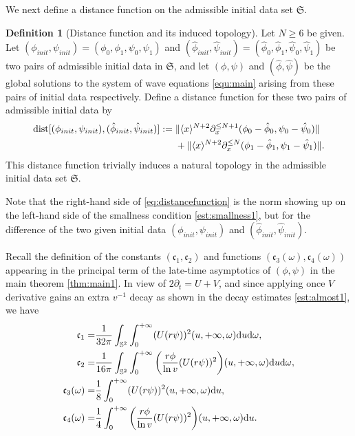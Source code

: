 \documentclass[a4paper,reqno]{amsart}
\theoremstyle{definition}
\newtheorem{definition}[theorem]{Definition}
\numberwithin{equation}{section}
\def \d {{\rm{d}}}
\def\cfrak{\mathfrak{c}}
\def\phiinit{\phi_{init}}
\def\phih{\hat{\phi}}
\def\psiinit{\psi_{init}}
\def\phihinit{\phih_{init}}
\def\psih{\hat{\psi}}
\def\psihinit{\psih_{init}}
\def\lab{\label}
\providecommand{\dist}[1]{\mathrm{dist}[#1]}
\def\Sfrak{\mathfrak{S}}
\begin{document}
We next define a distance function on the admissible initial data set $\Sfrak$.

\begin{definition}[Distance function and its induced topology]
\label{def:distancefunction}
Let $N\geq 6$ be given. Let $(\phiinit,\psiinit)=(\phi_0,\phi_1,\psi_0,\psi_1)$ and $(\phihinit,\psihinit)=(\hat\phi_0,\hat\phi_1,\hat\psi_0,\hat\psi_1)$ be two pairs of admissible initial data in $\Sfrak$, and let $(\phi,\psi)$ and $(\hat\phi,\hat\psi)$ be the global solutions to the system of wave equations \eqref{equ:main} arising from these pairs of initial data respectively. Define a distance function for these two pairs of admissible initial data by
\begin{align}
\lab{eq:distancefunction}
\dist{(\phiinit,\psiinit),(\phihinit,\psihinit)}
:={}&   \|\langle x\rangle^{{N}+2} \partial_x^{\leq N+1} (\phi_0-\hat\phi_0,  \psi_0-\hat\psi_0)\|\notag\\
    &+  \|\langle x\rangle^{{N}+2} \partial_x^{\leq N} (\phi_1-\hat\phi_1, \psi_1-\hat\psi_1)\|.
\end{align}
This distance function trivially induces a natural topology in the admissible initial data set $\Sfrak$. 
\end{definition}

Note that the right-hand side of \eqref{eq:distancefunction} is the norm showing up on the left-hand side of the smallness condition \eqref{est:smallness1}, but for the difference of the two given initial data  $(\phiinit,\psiinit)$ and $(\phihinit,\psihinit)$. 


Recall the definition of the constants $(\cfrak_1, \cfrak_2)$ and functions $(\cfrak_3(\omega), \cfrak_4(\omega))$ appearing in the principal term of the late-time asymptotics of $(\phi,\psi)$ in the main theorem \ref{thm:main1}. In view of $2\partial_t = U+V$, and since applying once $V$ derivative gains an extra $v^{-1}$ decay as shown in the decay estimates \eqref{est:almost1}, we have
\begin{subequations}
\label{def:cfrakanddfrakconsts:copy}
\begin{align}
\cfrak_1=&\frac{1}{32\pi }\int_{\mathbb{S}^2}\int_{0}^{+\infty}(U (r\psi))^2 (u,+\infty,\omega)\d u \d\omega, \\
\cfrak_2=&\frac{1}{16\pi}\int_{\mathbb{S}^2}\int_{0}^{+\infty}\bigg( \frac{r\phi}{\ln v} (U (r\psi))^2\bigg) (u,+\infty,\omega)\d u \d\omega, \\
 \cfrak_3(\omega)=&\frac{1}{8}\int_{0}^{+\infty}(U (r\psi))^2 (u,+\infty, \omega) \d u,\\
\cfrak_4(\omega)=&\frac{1}{4}\int_{0}^{+\infty} \bigg(\frac{r\phi}{\ln v} (U(r\psi))^2 \bigg)(u,+\infty,\omega)\d u.
\end{align}
\end{subequations}
\end{document}

